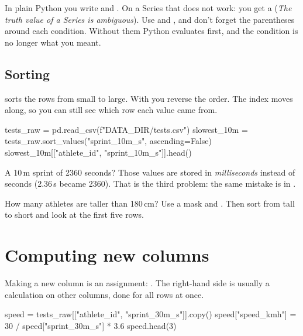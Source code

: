 \documentclass[11pt,a4paper]{article}
\begin{document}
\begin{watchout}
In plain Python you write  and . On a Series that
does not work: you get a  (\emph{The truth value of a
Series is ambiguous}). Use \code{\&} and \code{|}, and don't forget the
parentheses around each condition. Without them Python evaluates
\code{\&} first, and the condition is no longer what you meant.
\end{watchout}

\subsection{Sorting}

 sorts the rows from small to large. With
 you reverse the order. The index moves along, so
you can still see which row each value came from.

\begin{python}
tests_raw = pd.read_csv(f"{DATA_DIR}/tests.csv")
slowest_10m = tests_raw.sort_values("sprint_10m_s", ascending=False)
slowest_10m[["athlete_id", "sprint_10m_s"]].head()
\end{python}

A 10\,m sprint of 2360 seconds? Those values are stored in
\emph{milliseconds} instead of seconds (2.36\,s became 2360). That is
the third problem: the same mistake is in .

\begin{tryit}
How many athletes are taller than 180\,cm? Use a mask and
. Then sort  from tall to short and
look at the first five rows.
\end{tryit}

\section{Computing new columns}

Making a new column is an assignment: .
The right-hand side is usually a calculation on other columns, done for
all rows at once.

\begin{python}
speed = tests_raw[["athlete_id", "sprint_30m_s"]].copy()
speed["speed_kmh"] = 30 / speed["sprint_30m_s"] * 3.6
speed.head(3)
\end{python}
\end{document}
